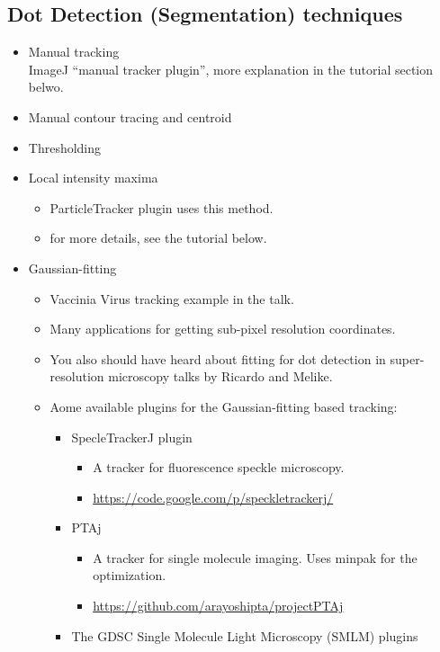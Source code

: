 \documentclass[11pnt]{article}
\begin{document}
\subsection{Dot Detection (Segmentation) techniques}
\begin{itemize}
\item Manual tracking\\
ImageJ ``manual tracker plugin'', more explanation in the tutorial section belwo.
\item Manual contour tracing and centroid
\item Thresholding
\item Local intensity maxima
  \begin{itemize}
      \item ParticleTracker plugin uses this method. 
      \item for more details, see the tutorial below. 
  \end{itemize}
\item Gaussian-fitting
\begin{itemize}
\item Vaccinia Virus tracking example in the talk. 
\item Many applications for getting sub-pixel resolution coordinates.
\item You also should have heard about fitting for dot detection in super-resolution microscopy talks by Ricardo and Melike.
\item Aome available plugins for the Gaussian-fitting based tracking:
\begin{itemize}
    \item SpecleTrackerJ plugin
      \begin{itemize}
          \item A tracker for fluorescence speckle microscopy. 
          \item \url{https://code.google.com/p/speckletrackerj/}
      \end{itemize}
      \item PTAj
      \begin{itemize} 
          \item A tracker for single molecule imaging. Uses minpak for the optimization. 
          \item \url{https://github.com/arayoshipta/projectPTAj}
      \end{itemize}
      \item The GDSC Single Molecule Light Microscopy (SMLM) plugins
      \begin{itemize}

\end{itemize}
\end{itemize}
\end{itemize}
\end{itemize}
\end{document}
